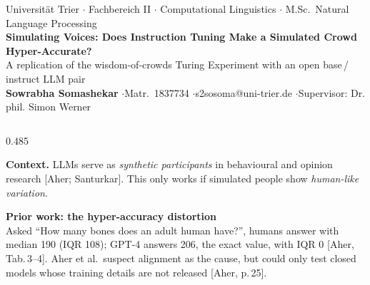 \documentclass[final]{beamer}
\newcommand{\fsBody}{\fontsize{26}{32}\selectfont}
\newcommand{\fsSub}{\fontsize{30}{36}\selectfont\bfseries}
\newcommand{\fsTitle}{\fontsize{68}{78}\selectfont\bfseries}
\renewcommand{\cite}[1]{{\color{navy!80}[#1]}}
\begin{document}
\begin{frame}[t]
\vspace{-6mm}

\begin{tcolorbox}[enhanced, colback=navy, colframe=navy, arc=5mm, left=15mm, right=15mm, top=5mm, bottom=5mm, halign=center]
  {\fontsize{28}{34}\selectfont\color{white!80} Universität Trier $\cdot$ Fachbereich II $\cdot$ Computational Linguistics $\cdot$ M.Sc.\ Natural Language Processing}\\[3mm]
  {\fsTitle\color{white} Simulating Voices: Does Instruction Tuning Make a Simulated Crowd Hyper-Accurate?}\\[3mm]
  {\fontsize{36}{44}\selectfont\color{teal!25} A replication of the wisdom-of-crowds Turing Experiment with an open base\,/\,instruct LLM pair}\\[5mm]
  {\fontsize{30}{36}\selectfont\color{white} \textbf{Sowrabha Somashekar} \quad$\cdot$\quad Matr.\ 1837734 \quad$\cdot$\quad s2sosoma@uni-trier.de \quad$\cdot$\quad Supervisor: Dr. phil. Simon Werner}
\end{tcolorbox}

\vspace{3mm}

\begin{columns}[T]
\begin{column}{0.485\linewidth}

\begin{tcolorbox}[sec, title={1. Hypothesis}]
\fsBody
\textbf{Context.} LLMs serve as \emph{synthetic participants} in behavioural and opinion research \cite{Aher; Santurkar}. This only works if simulated people show \emph{human-like variation}.

\vspace{4mm}
\begin{tcolorbox}[card]
{\fsSub\color{navy} Prior work: the hyper-accuracy distortion}\\[2mm]
Asked ``How many bones does an adult human have?'', humans answer with median 190 (IQR 108); GPT-4 answers 206, the exact value, with IQR 0 \cite{Aher, Tab.\,3--4}.
Aher et al.\ suspect alignment as the cause, but could only test closed models whose training details are not released \cite{Aher, p.\,25}.
\end{tcolorbox}


\end{tcolorbox}
\end{column}
\end{columns}
\end{frame}
\end{document}
